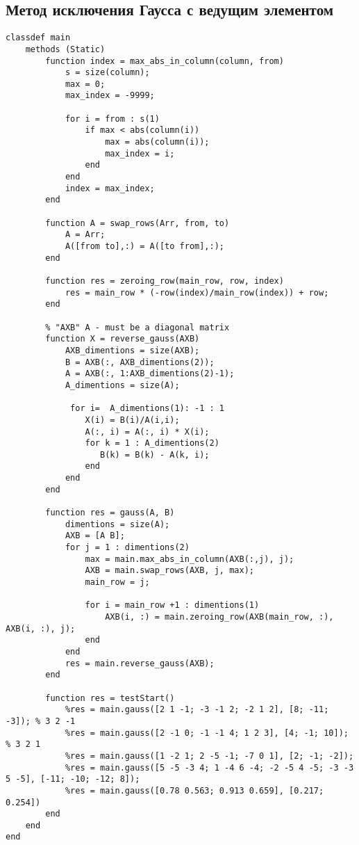 \documentclass{article}
\begin{document}
\subsection{Метод исключения Гаусса с ведущим элементом}
\begin{lstlisting}
classdef main
    methods (Static)
        function index = max_abs_in_column(column, from)
            s = size(column);
            max = 0;
            max_index = -9999;

            for i = from : s(1)
                if max < abs(column(i))
                    max = abs(column(i));
                    max_index = i;
                end
            end
            index = max_index;
        end

        function A = swap_rows(Arr, from, to)
            A = Arr;
            A([from to],:) = A([to from],:);    
        end

        function res = zeroing_row(main_row, row, index)
            res = main_row * (-row(index)/main_row(index)) + row;
        end

        % "AXB" A - must be a diagonal matrix
        function X = reverse_gauss(AXB)
            AXB_dimentions = size(AXB);
            B = AXB(:, AXB_dimentions(2));
            A = AXB(:, 1:AXB_dimentions(2)-1);
            A_dimentions = size(A);

             for i=  A_dimentions(1): -1 : 1
                X(i) = B(i)/A(i,i);
                A(:, i) = A(:, i) * X(i);
                for k = 1 : A_dimentions(2)
                   B(k) = B(k) - A(k, i);
                end
            end
        end

        function res = gauss(A, B)
            dimentions = size(A);
            AXB = [A B];
            for j = 1 : dimentions(2)
                max = main.max_abs_in_column(AXB(:,j), j);
                AXB = main.swap_rows(AXB, j, max); 
                main_row = j;

                for i = main_row +1 : dimentions(1)
                    AXB(i, :) = main.zeroing_row(AXB(main_row, :), AXB(i, :), j);
                end
            end
            res = main.reverse_gauss(AXB);
        end

        function res = testStart()
            %res = main.gauss([2 1 -1; -3 -1 2; -2 1 2], [8; -11; -3]); % 3 2 -1
            %res = main.gauss([2 -1 0; -1 -1 4; 1 2 3], [4; -1; 10]); % 3 2 1
            %res = main.gauss([1 -2 1; 2 -5 -1; -7 0 1], [2; -1; -2]);
            %res = main.gauss([5 -5 -3 4; 1 -4 6 -4; -2 -5 4 -5; -3 -3 5 -5], [-11; -10; -12; 8]); 
            %res = main.gauss([0.78 0.563; 0.913 0.659], [0.217; 0.254])
        end
    end
end
\end{lstlisting}
\end{document}

